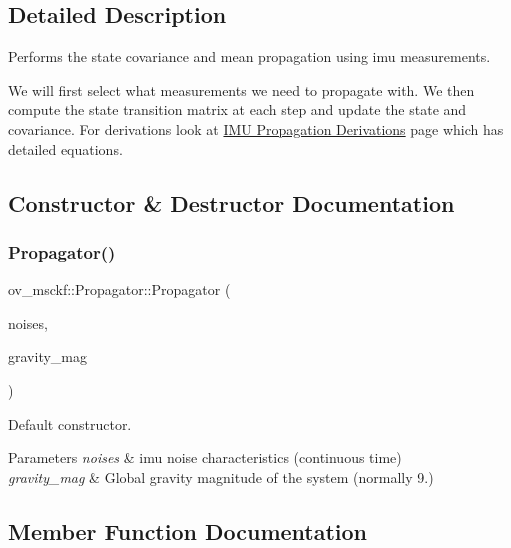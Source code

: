 \subsection{Detailed Description}
Performs the state covariance and mean propagation using imu measurements. 

We will first select what measurements we need to propagate with. We then compute the state transition matrix at each step and update the state and covariance. For derivations look at \hyperlink{propagation}{I\+MU Propagation Derivations} page which has detailed equations. 

\subsection{Constructor \& Destructor Documentation}
\mbox{\label{classov__msckf_1_1Propagator_a041751e94b04af4134c31a5f32c58d47}} 
\subsubsection{\texorpdfstring{Propagator()}{Propagator()}}
{\footnotesize\ttfamily ov\+\_\+msckf\+::\+Propagator\+::\+Propagator (\begin{DoxyParamCaption}\item[{\hyperlink{structov__msckf_1_1NoiseManager}{Noise\+Manager}}]{noises,  }\item[{double}]{gravity\+\_\+mag }\end{DoxyParamCaption})\hspace{0.3cm}{\ttfamily [inline]}}



Default constructor. 


\begin{DoxyParams}{Parameters}
{\em noises} & imu noise characteristics (continuous time) \\
\hline
{\em gravity\+\_\+mag} & Global gravity magnitude of the system (normally 9.) \\
\hline
\end{DoxyParams}


\subsection{Member Function Documentation}
\mbox{\label{classov__msckf_1_1Propagator_a33aabf2aea886a848a5ea3f6d83be4a4}} 
